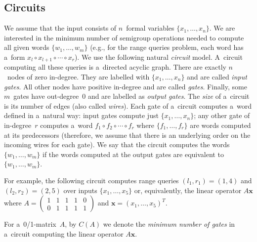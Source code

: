 \documentclass[11pt,letterpaper]{article}
\begin{document}
\subsection{Circuits}
We assume that the input consists of $n$~formal variables
$\{x_1, \dotsc, x_n\}$. We are interested in the minimum number of semigroup
operations needed to compute all given words $\{w_1, \dotsc, w_m\}$ (e.g., for
the range queries problem, each word has a~form $x_l\circ x_{l+1}\circ \dotsb \circ x_r$). We use
the following natural {\em circuit} model. A~circuit computing all these queries
is a~directed acyclic graph. There are exactly $n$~nodes of zero in-degree. They
are labelled with $\{x_1, \dotsc, x_n\}$ and are called {\em input gates}. All
other nodes have positive in-degree and are called {\em gates}. Finally, some
$m$~gates have out-degree~0 and are labelled as {\em output gates}. The
{\em size} of a~circuit is its number of edges (also called {\em wires}). Each
gate of a~circuit computes a~word defined in a~natural way: input gates compute
just $\{x_1, \dotsc, x_n\}$; any other gate of in-degree~$r$ computes a~word
$f_1 \circ f_2 \circ \dotsb \circ f_r$ where $\{f_1, \dotsc, f_r\}$ are words
computed at its predecessors (therefore, we assume that there is an underlying
order on the incoming wires for each gate). We say that the circuit computes the
words $\{w_1, \dotsc, w_m\}$ if the words computed at the output gates are
equivalent to $\{w_1, \dotsc, w_m\}$.

For example, the following circuit computes range queries $(l_1,r_1)=(1,4)$ and
$(l_2,r_2)=(2,5)$ over inputs $\{x_1, \dotsc, x_5\}$ or, equivalently, the
linear operator $A\mathbf{x}$ where
$A=\begin{pmatrix}1&1&1&1&0\\0&1&1&1&1\end{pmatrix}$ and
$\mathbf{x}=(x_1, \dotsc, x_5)^T$.

\begin{center}
\end{center}

For a~0/1-matrix~$A$, by $C(A)$ we denote the \emph{minimum number of gates} in
a~circuit computing the linear operator $A\mathbf{x}$.
\end{document}
